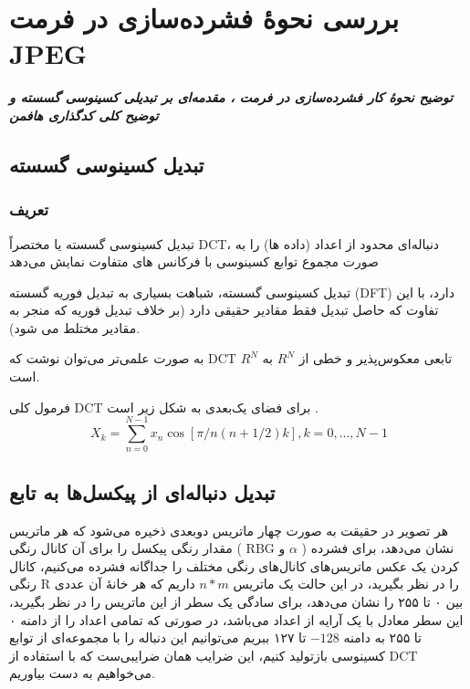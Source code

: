 \chapter{بررسی نحوهٔ فشرده‌سازی در فرمت JPEG}
\noindent
\textbf{
	\textit{
        توضیح نحوهٔ کار فشرده‌سازی در فرمت ، 
        مقدمه‌ای بر تبدیلی کسینوسی گسسته و 
        توضیح کلی کدگذاری هافمن
	}
}
\pagebreak

\section{تبدیل کسینوسی گسسته}

\subsection{
تعریف 
}

تبدیل کسینوسی گسسته  
یا مختصراً
 DCT، دنباله‌ای محدود از اعداد (داده ها) را به‌ صورت مجموع توابع کسینوسی با فرکانس های متفاوت نمایش می‌دهد

 
 تبدیل کسینوسی گسسته، شباهت بسیاری به تبدیل فوریه گسسته (DFT) دارد، با این تفاوت که حاصل تبدیل فقط مقادیر حقیقی دارد (بر خلاف تبدیل فوریه که منجر به مقادیر مختلط می شود).

 به صورت علمی‌تر می‌توان نوشت که 
 DCT 
 تابعی معکوس‌پذیر و خطی از 
 $R^N$ 
 به 
 $R^N$
 است.

 فرمول کلی DCT 
 برای فضای یک‌بعدی به شکل زیر است
\cite{dct}.
 \begin{equation}
 X_k = \sum_{n = 0}^{N - 1} x_n \cos [\pi / n  (n + 1/2)k]
 , k = 0, ..., N - 1
 \end{equation}

 \section{تبدیل دنباله‌ای از پیکسل‌ها به تابع}
هر تصویر در حقیقت به صورت چهار ماتریس دوبعدی ذخیره می‌شود که هر ماتریس مقدار رنگی پیکسل را برای آن کانال رنگی
(
RBG و $\alpha$
)
نشان می‌دهد، برای فشرده کردن یک عکس ماتریس‌های کانال‌های رنگی مختلف را جداگانه فشرده می‌کنیم، کانال رنگی R 
را در نظر بگیرید، در این حالت یک ماتریس 
$n * m$ 
داریم که هر خانهٔ آن عددی بین ۰ تا ۲۵۵ را نشان می‌دهد، برای سادگی یک سطر از این ماتریس را در نظر بگیرید، این سطر معادل با یک 
آرایه از اعداد می‌باشد، در صورتی که تمامی اعداد را از دامنه ۰ تا ۲۵۵ به دامنه
$ -128 $ تا ۱۲۷ ببریم می‌توانیم این دنباله را با مجموعه‌ای از 
توابع کسینوسی بازتولید کنیم، این ضرایب همان ضرایبی‌ست که با استفاده از DCT 
می‌خواهیم به دست بیاوریم.

